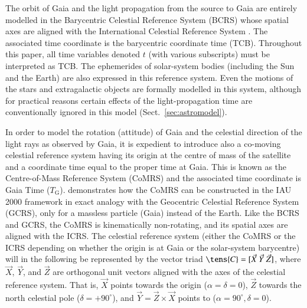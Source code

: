 \documentclass[structabstract]{aa}
\begin{document}
The orbit of Gaia and the light propagation from the source to Gaia
are entirely modelled in the Barycentric Celestial Reference System (BCRS)
whose spatial axes are aligned with the International Celestial Reference
System \citep[ICRS,][]{icrs1998}. The associated time coordinate is the
barycentric coordinate time (TCB). Throughout this paper, all time variables
denoted $t$ (with various subscripts) must be interpreted as TCB. The
ephemerides of solar-system bodies (including the Sun and the Earth) are
also expressed in this reference system. Even the motions of the stars
and extragalactic objects are
formally modelled in this system, although for practical reasons certain
effects of the light-propagation time are conventionally ignored in this
model (Sect.~\ref{sec:astromodel}).

In order to model the rotation (attitude) of Gaia and the celestial direction
of the light rays as observed by Gaia, it is expedient to introduce also a
co-moving celestial reference system having its origin at the centre of mass
of the satellite and a coordinate time equal to the proper time at Gaia.
This is known as the Centre-of-Mass Reference System (CoMRS) and the associated
time coordinate is Gaia Time ($T_\text{G}$). \citet{klioner2004} demonstrates
how the CoMRS can be constructed in the IAU 2000 framework in exact analogy
with the Geocentric Celestial Reference System (GCRS), only for a massless
particle (Gaia) instead of the Earth. Like the BCRS and GCRS, the CoMRS is
kinematically non-rotating, and its spatial axes are aligned with the ICRS.
The celestial reference system (either the CoMRS or the ICRS depending on whether 
the origin is at Gaia or the solar-system barycentre) will in the following be 
represented by the vector triad $\tens{C}=[\vec{X}~\vec{Y}~\vec{Z}]$, where
$\vec{X}$, $\vec{Y}$, and $\vec{Z}$ are orthogonal unit vectors aligned with
the axes of the celestial reference system. That is, $\vec{X}$ points towards
the origin ($\alpha=\delta=0$), $\vec{Z}$ towards the north celestial pole
($\delta=+90^\circ$), and $\vec{Y}=\vec{Z}\times\vec{X}$ points to
($\alpha=90^\circ, \delta=0$). 
\end{document}
